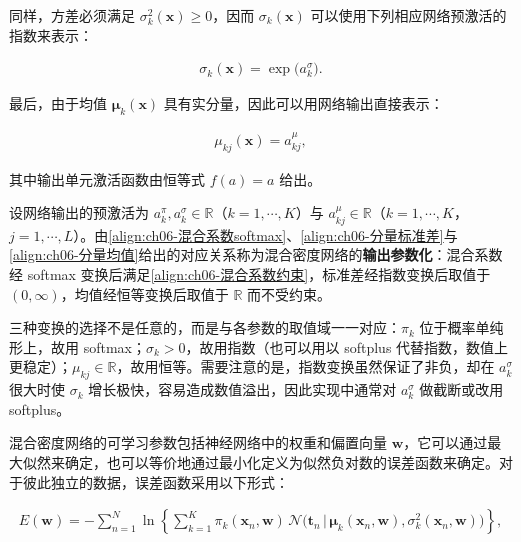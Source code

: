 \documentclass[../../main.tex]{subfiles}
\begin{document}
同样，方差必须满足 $\sigma_k^{2}(\boldsymbol{x})\geqslant0$，因而 $\sigma_k(\boldsymbol{x})$ 可以使用下列相应网络预激活的指数来表示：

\begin{align}
\sigma_k(\boldsymbol{x})=\exp\bigl(a_k^{\sigma}\bigr).
\label{align:ch06-分量标准差}
\end{align}

最后，由于均值 $\boldsymbol{\mu}_k(\boldsymbol{x})$ 具有实分量，因此可以用网络输出直接表示：

\begin{align}
\mu_{kj}(\boldsymbol{x})=a_{kj}^{\mu},
\label{align:ch06-分量均值}
\end{align}

其中输出单元激活函数由恒等式 $f(a)=a$ 给出。

\begin{definition}\label{definition:ch06-MDN参数化}
设网络输出的预激活为 $a_{k}^{\pi},a_{k}^{\sigma}\in\mathbb{R}$（$k=1,\cdots,K$）与 $a_{kj}^{\mu}\in\mathbb{R}$（$k=1,\cdots,K$，$j=1,\cdots,L$）。由\eqref{align:ch06-混合系数softmax}、\eqref{align:ch06-分量标准差}与\eqref{align:ch06-分量均值}给出的对应关系称为混合密度网络的\textbf{输出参数化}：混合系数经 softmax 变换后满足\eqref{align:ch06-混合系数约束}，标准差经指数变换后取值于 $(0,\infty)$，均值经恒等变换后取值于 $\mathbb{R}$ 而不受约束。
\end{definition}

\begin{remark}三种变换的选择不是任意的，而是与各参数的取值域一一对应：$\pi_k$ 位于概率单纯形上，故用 softmax；$\sigma_k>0$，故用指数（也可以用以 softplus 代替指数，数值上更稳定）；$\mu_{kj}\in\mathbb{R}$，故用恒等。需要注意的是，指数变换虽然保证了非负，却在 $a_k^{\sigma}$ 很大时使 $\sigma_k$ 增长极快，容易造成数值溢出，因此实现中通常对 $a_k^{\sigma}$ 做截断或改用 softplus。
\end{remark}

混合密度网络的可学习参数包括神经网络中的权重和偏置向量 $\boldsymbol{w}$，它可以通过最大似然来确定，也可以等价地通过最小化定义为似然负对数的误差函数来确定。对于彼此独立的数据，误差函数采用以下形式：

\begin{align}
E(\boldsymbol{w})=-\sum_{n=1}^{N}\ln\left\{\sum_{k=1}^{K}\pi_k(\boldsymbol{x}_n,\boldsymbol{w})\,\mathcal{N}\bigl(\boldsymbol{t}_n\,\big|\,\boldsymbol{\mu}_k(\boldsymbol{x}_n,\boldsymbol{w}),\sigma_k^{2}(\boldsymbol{x}_n,\boldsymbol{w})\bigr)\right\},
\label{align:ch06-混合密度误差}
\end{align}
\end{document}
